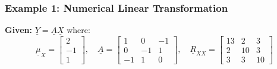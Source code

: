 \documentclass[12pt]{article}
\begin{document}
\subsubsection*{Example 1: Numerical Linear Transformation}
\textbf{Given:} $\underline{Y} = \underline{A}\underline{X}$ where:
\[
\underline{\mu}_{X} = \begin{bmatrix} 2 \\ -1 \\ 1 \end{bmatrix}, \quad \underline{A} = \begin{bmatrix} 1 & 0 & -1 \\ 0 & -1 & 1 \\ -1 & 1 & 0 \end{bmatrix}, \quad \underline{R}_{XX} = \begin{bmatrix} 13 & 2 & 3 \\ 2 & 10 & 3 \\ 3 & 3 & 10 \end{bmatrix}
\]
\end{document}
